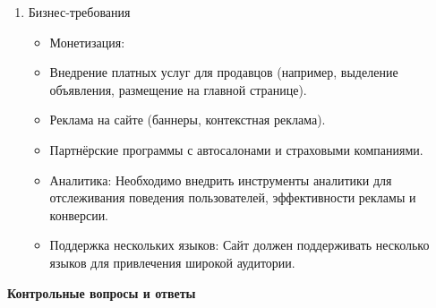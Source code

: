 \begin{enumerate}
\begin{itemize}
        \end{itemize}
    \item Бизнес-требования
        \begin{itemize}
            \item Монетизация:
            \item Внедрение платных услуг для продавцов (например, выделение объявления, размещение на главной странице).
            \item Реклама на сайте (баннеры, контекстная реклама).
            \item Партнёрские программы с автосалонами и страховыми компаниями.
            \item Аналитика: Необходимо внедрить инструменты аналитики для отслеживания поведения пользователей, эффективности рекламы и конверсии.
            \item Поддержка нескольких языков: Сайт должен поддерживать несколько языков для привлечения широкой аудитории.
        \end{itemize}
\end{enumerate}

\textbf{Контрольные вопросы и ответы}

